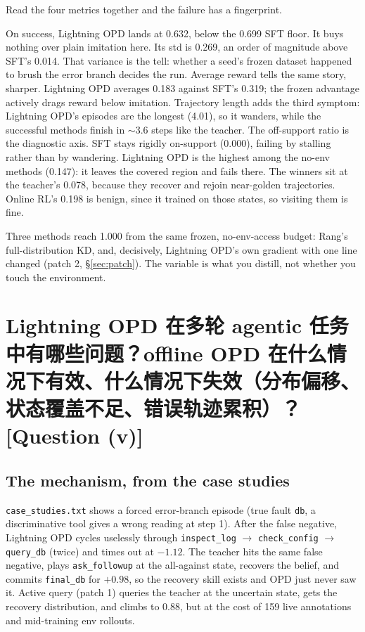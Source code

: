 \documentclass[11pt]{article}
\newcommand{\code}[1]{\texttt{#1}}
\newcommand{\qtag}[1]{\hfill{\normalfont\small\color{gray}[Question (#1)]}}
\begin{document}
Read the four metrics together and the failure has a fingerprint.

On success, Lightning OPD lands at 0.632, below the 0.699 SFT
floor. It buys nothing over plain imitation here. Its std is 0.269, an order
of magnitude above SFT's 0.014. That variance is the tell: whether a seed's
frozen dataset happened to brush the error branch decides the run. Average reward
tells the same story, sharper. Lightning OPD averages 0.183 against SFT's 0.319;
the frozen advantage actively drags reward below imitation. Trajectory length adds
the third symptom: Lightning OPD's episodes are the longest (4.01), so it wanders,
while the successful methods finish in $\sim$3.6 steps like the teacher. The
off-support ratio is the diagnostic axis. SFT stays rigidly on-support (0.000),
failing by stalling rather than by wandering. Lightning OPD is the highest among the
no-env methods (0.147): it leaves the covered region and fails there. The winners sit
at the teacher's 0.078, because they recover and rejoin near-golden trajectories.
Online RL's 0.198 is benign, since it trained on those states, so visiting them is fine.

Three methods reach 1.000 from the same frozen, no-env-access budget:
Rang's full-distribution KD, and, decisively, Lightning OPD's own gradient
with one line changed (patch 2, \S\ref{sec:patch}). The variable is what you
distill, not whether you touch the environment.

\section{Lightning OPD 在多轮 agentic 任务中有哪些问题？offline OPD 在什么情况下有效、什么情况下失效（分布偏移、状态覆盖不足、错误轨迹累积）？ \qtag{v}}
\label{sec:why}

\subsection{The mechanism, from the case studies}

\code{case\_studies.txt} shows a forced error-branch episode (true fault
\code{db}, a discriminative tool gives a wrong reading at step 1). After the false
negative, Lightning OPD cycles uselessly through \code{inspect\_log} $\to$
\code{check\_config} $\to$ \code{query\_db} (twice) and times out at $-1.12$. The
teacher hits the same false negative, plays \code{ask\_followup} at the all-against
state, recovers the belief, and commits \code{final\_db} for $+0.98$, so the recovery
skill exists and OPD just never saw it. Active query (patch 1) queries the teacher at
the uncertain state, gets the recovery distribution, and climbs to 0.88, but at the
cost of 159 live annotations and mid-training env rollouts.
\end{document}
